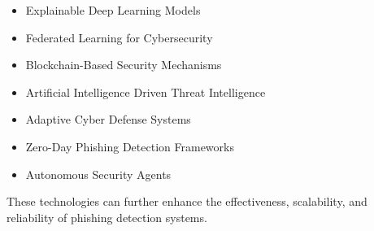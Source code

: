 \documentclass[12pt]{report}
\begin{document}
\begin{itemize}
    \item Explainable Deep Learning Models
    \item Federated Learning for Cybersecurity
    \item Blockchain-Based Security Mechanisms
    \item Artificial Intelligence Driven Threat Intelligence
    \item Adaptive Cyber Defense Systems
    \item Zero-Day Phishing Detection Frameworks
    \item Autonomous Security Agents
\end{itemize}

These technologies can further enhance the effectiveness, scalability, and reliability of phishing detection systems.
\end{document}
